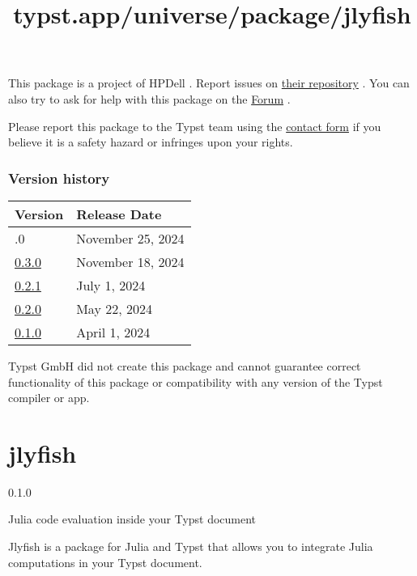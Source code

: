 This package is a project of HPDell . Report issues on
\href{https://github.com/HPdell/typst-cineca}{their repository} . You
can also try to ask for help with this package on the
\href{https://forum.typst.app}{Forum} .

Please report this package to the Typst team using the
\href{https://typst.app/contact}{contact form} if you believe it is a
safety hazard or infringes upon your rights.

\label{versions}
\subsubsection{Version history}\label{version-history}

\begin{longtable}[]{@{}ll@{}}
\toprule\noalign{}
Version & Release Date \\
\midrule\noalign{}
\endhead
\bottomrule\noalign{}
\endlastfoot
0.4.0 & November 25, 2024 \\
\href{https://typst.app/universe/package/cineca/0.3.0/}{0.3.0} &
November 18, 2024 \\
\href{https://typst.app/universe/package/cineca/0.2.1/}{0.2.1} & July 1,
2024 \\
\href{https://typst.app/universe/package/cineca/0.2.0/}{0.2.0} & May 22,
2024 \\
\href{https://typst.app/universe/package/cineca/0.1.0/}{0.1.0} & April
1, 2024 \\
\end{longtable}

Typst GmbH did not create this package and cannot guarantee correct
functionality of this package or compatibility with any version of the
Typst compiler or app.


\title{typst.app/universe/package/jlyfish}

\label{banner}
\section{jlyfish}\label{jlyfish}

{ 0.1.0 }

Julia code evaluation inside your Typst document

\label{readme}
\pandocbounded{}

Jlyfish is a package for Julia and Typst that allows you to integrate
Julia computations in your Typst document.

